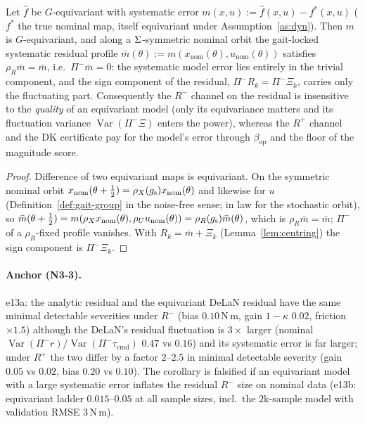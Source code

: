 \begin{corollary}
\label{cor:n3-3}
Let $\hat f$ be $G$-equivariant with systematic error $m(x,u) := \hat f(x,u)
- f^*(x,u)$ ($f^*$ the true nominal map, itself equivariant under
Assumption~\ref{as:dyn}). Then $m$ is $G$-equivariant, and along a
$\Sigma$-symmetric nominal orbit the gait-locked systematic residual profile
$\bar m(\theta) := m(x_{\mathrm{nom}}(\theta), u_{\mathrm{nom}}(\theta))$
satisfies $\rho_R \bar m = \bar m$, i.e.\ $\Pi^-\bar m = 0$: the systematic
model error lies entirely in the trivial component, and the sign component
of the residual, $\Pi^- R_k = \Pi^- \Xi_k$, carries only the fluctuating
part. Consequently the $R^-$ channel on the residual is insensitive to the
\emph{quality} of an equivariant model (only its equivariance matters and
its fluctuation variance $\operatorname{Var}(\Pi^-\Xi)$ enters the power),
whereas the $R^+$ channel and the DK certificate pay for the model's error
through $\beta_{\mathrm{op}}$ and the floor of the magnitude score.
\end{corollary}

\begin{proof}
Difference of two equivariant maps is equivariant. On the symmetric nominal
orbit $x_{\mathrm{nom}}(\theta + \tfrac12) = \rho_{X}(g_{\mathrm{s}})x_{\mathrm{nom}}(\theta)$
and likewise for $u$ (Definition~\ref{def:gait-group} in the noise-free
sense; in law for the stochastic orbit), so $\bar m(\theta + \tfrac12) =
m(\rho_{X} x_{\mathrm{nom}}(\theta), \rho_{U} u_{\mathrm{nom}}(\theta)) = \rho_{R}(g_{\mathrm{s}})
\bar m(\theta)$, which is $\rho_R\bar m = \bar m$; $\Pi^-$ of a
$\rho_R$-fixed profile vanishes. With $R_k = \bar m + \Xi_k$ (Lemma~\ref{lem:centring})
the sign component is $\Pi^-\Xi_k$.
\end{proof}

\paragraph{Anchor (N3-3).}
e13a: the analytic residual and the equivariant DeLaN residual have the same
minimal detectable severities under $R^-$ (bias $0.10$\,N\,m, gain
$1 - \kappa$ $0.02$, friction $\times 1.5$) although the DeLaN's residual
fluctuation is $3\times$ larger (nominal $\operatorname{Var}(\Pi^-r)/\operatorname{Var}(\Pi^-\tau_{\mathrm{cmd}})$
$0.47$ vs $0.16$) and its systematic error is far larger; under $R^+$ the two
differ by a factor $2$--$2.5$ in minimal detectable severity (gain $0.05$ vs
$0.02$, bias $0.20$ vs $0.10$). The corollary is falsified if an
equivariant model with a large systematic error inflates the residual
$R^-$ size on nominal data (e13b: equivariant ladder $0.015$--$0.05$ at all
sample sizes, incl.\ the $2$k-sample model with validation RMSE $3$\,N\,m).

